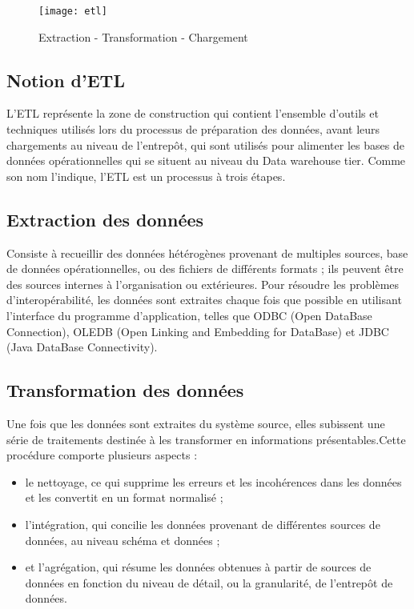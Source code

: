 \begin{figure}[H]
    \centering
    \texttt{[image: etl]}
    \caption{Extraction - Transformation - Chargement}
    \label{fig:etl}
\end{figure}

\subsection{Notion d’ETL}
L'ETL représente la zone de construction qui contient l’ensemble d’outils et techniques utilisés lors du processus de préparation des données, avant leurs chargements au niveau de l’entrepôt, qui sont utilisés pour alimenter les bases de données opérationnelles qui se situent au niveau du Data warehouse tier. Comme son nom l’indique, l’ETL est un processus à trois étapes.

\subsection{Extraction des données}
Consiste à recueillir des données hétérogènes provenant de multiples sources, base de données opérationnelles, ou des fichiers de différents formats ; ils peuvent être des sources internes à l’organisation ou extérieures. Pour résoudre les problèmes d’interopérabilité, les données sont extraites chaque fois que possible en utilisant l’interface du programme d’application, telles que ODBC (Open DataBase Connection), OLEDB (Open Linking and Embedding for DataBase) et JDBC (Java DataBase Connectivity). \cite{book:10}

\subsection{Transformation des données}
Une fois que les données sont extraites du système source, elles subissent une série de traitements destinée à les transformer en informations présentables.Cette procédure comporte plusieurs aspects : \cite{book:11}
\begin{itemize}
    \item le nettoyage, ce qui supprime les erreurs et les incohérences dans les données et les convertit en un format normalisé ; 
    \item l’intégration, qui concilie les données provenant de différentes sources de données, au niveau schéma et données ; 
    \item et l’agrégation, qui résume les données obtenues à partir de sources de données en fonction du niveau de détail, ou la granularité, de l’entrepôt de données.
\end{itemize}

